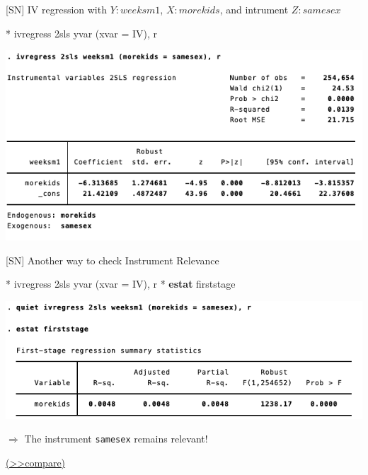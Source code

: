 \documentclass[
  10pt,
  ignorenonframetext,
]{beamer}
\newenvironment{Shaded}{\begin{snugshade}}{\end{snugshade}}
\newcommand{\FunctionTok}[1]{\textcolor[rgb]{0.00,0.00,0.00}{#1}}
\newcommand{\KeywordTok}[1]{\textcolor[rgb]{0.13,0.29,0.53}{\textbf{#1}}}
\newcommand{\NormalTok}[1]{#1}
\begin{document}
\begin{frame}[fragile]{{[}SN{]} IV regression with \(Y:weeksm1\),
\(X:morekids\), and intrument \(Z:samesex\)}
\protect\hypertarget{sn-iv-regression-with-yweeksm1-xmorekids-and-intrument-zsamesex}{}
\small

\begin{Shaded}
\begin{Highlighting}[]
\NormalTok{* ivregress 2sls yvar (xvar = IV), }\FunctionTok{r}
\end{Highlighting}
\end{Shaded}

\begin{center}\includegraphics[width=1\linewidth]{pictures/res3-ivregress} \end{center}
\end{frame}

\begin{frame}[fragile]{{[}SN{]} Another way to check Instrument
Relevance}
\protect\hypertarget{IVestatFirstStage}{}
\small

\begin{Shaded}
\begin{Highlighting}[]
\NormalTok{* ivregress 2sls yvar (xvar = IV), }\FunctionTok{r}
\NormalTok{* }\KeywordTok{estat}\NormalTok{ firststage}
\end{Highlighting}
\end{Shaded}

\begin{center}\includegraphics[width=1\linewidth]{pictures/res4-estatFirstStage} \end{center}

\(\Rightarrow\) The instrument \texttt{samesex} remains relevant!

\footnotesize \protect\hyperlink{res2-regFirstStage}{(\textgreater\textgreater compare)}
\normalsize
\end{frame}
\end{document}
